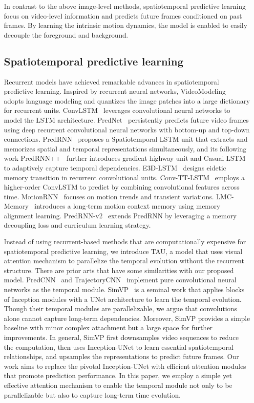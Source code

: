 \documentclass[10pt,twocolumn,letterpaper]{article}
\begin{document}
In contrast to the above image-level methods, spatiotemporal predictive learning focus on video-level information and predicts future frames conditioned on past frames. By learning the intrinsic motion dynamics, the model is enabled to easily decouple the foreground and background.

\subsection{Spatiotemporal predictive learning}

Recurrent models have achieved remarkable advances in spatiotemporal predictive learning. Inspired by recurrent neural networks, VideoModeling~\cite{marc2014video} adopts language modeling and quantizes the image patches into a large dictionary for recurrent units. ConvLSTM~\cite{convlstm} leverages convolutional neural networks to model the LSTM architecture. PredNet~\cite{prednet} persistently predicts future video frames using deep recurrent convolutional neural networks with bottom-up and top-down connections. PredRNN~\cite{predrnn} proposes a Spatiotemporal LSTM unit that extracts and memorizes spatial and temporal representations simultaneously, and its following work PredRNN++~\cite{predrnn++} further introduces gradient highway unit and Casual LSTM to adaptively capture temporal dependencies. E3D-LSTM~\cite{e3dlstm} designs eidetic memory transition in recurrent convolutional units. Conv-TT-LSTM~\cite{su2020convolutional} employs a higher-order ConvLSTM to predict by combining convolutional features across time. MotionRNN~\cite{wu2021motionrnn} focuses on motion trends and transient variations. LMC-Memory~\cite{lee2021video} introduces a long-term motion context memory using memory alignment learning. PredRNN-v2~\cite{predrnnv2} extends PredRNN by leveraging a memory decoupling loss and curriculum learning strategy.


Instead of using recurrent-based methods that are computationally expensive for spatiotemporal predictive learning, we introduce TAU, a model that uses visual attention mechanism to parallelize the temporal evolution without the recurrent structure.
There are prior arts that have some similarities with our proposed model. PredCNN~\cite{predcnn} and TrajectoryCNN~\cite{liu2020trajectorycnn} implement pure convolutional neural networks as the temporal module. SimVP~\cite{Gao_2022_CVPR} is a seminal work that applies blocks of Inception modules with a UNet architecture to learn the temporal evolution. Though their temporal modules are parallelizable, we argue that convolutions alone cannot capture long-term dependencies. Moreover, SimVP provides a simple baseline with minor complex attachment but a large space for further improvements. In general, SimVP first downsamples video sequences to reduce the computation, then uses Inception-UNet to learn essential spatiotemporal relationships, and upsamples the representations to predict future frames. Our work aims to replace the pivotal Inception-UNet with efficient attention modules that promote prediction performance. In this paper, we employ a simple yet effective attention mechanism to enable the temporal module not only to be parallelizable but also to capture long-term time evolution.
\end{document}

